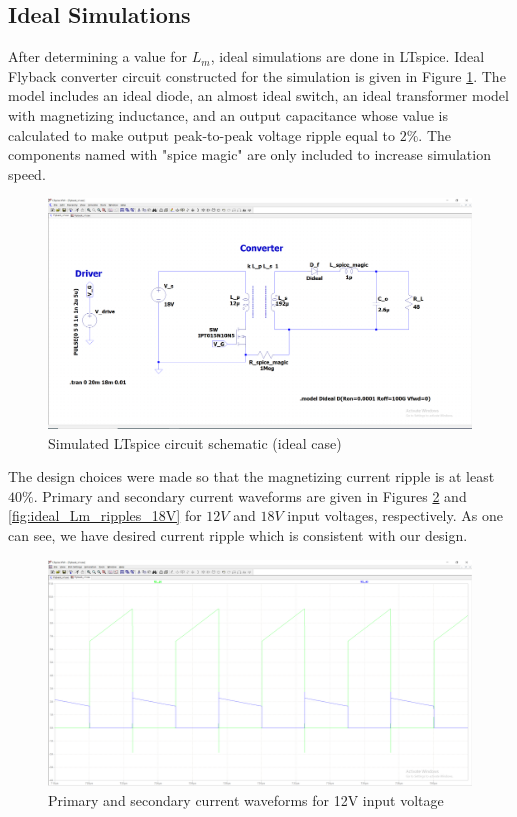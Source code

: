 \documentclass[12pt]{article}
\begin{document}
    \subsection{Ideal Simulations}
    After determining a value for $L_m$, ideal simulations are done in LTspice. Ideal Flyback converter circuit constructed for the simulation is given in Figure \ref{fig:ideal_sim_circuit}. The model includes an ideal diode, an almost ideal switch, an ideal transformer model with magnetizing inductance, and an output capacitance whose value is calculated to make output peak-to-peak voltage ripple equal to $2\%$. The components named with "spice magic" are only included to increase simulation speed.  \\
    
    \begin{figure}[H]
        \centering
        \includegraphics[scale=0.3]{img/Spice_Sim/Ideal/ideal_simulation_circuit.PNG}
        \caption{Simulated LTspice circuit schematic (ideal case)}
        \label{fig:ideal_sim_circuit}
    \end{figure}

    The design choices were made so that the magnetizing current ripple is at least $40\%$. Primary and secondary current waveforms are given in Figures \ref{fig:ideal_Lm_ripples_12V} and \ref{fig:ideal_Lm_ripples_18V} for $12V$ and $18V$ input voltages, respectively. As one can see, we have desired current ripple which is consistent with our design. \\

    \begin{figure}[H]
        \centering
        \includegraphics[scale=0.3]{img/Spice_Sim/Ideal/ideal_Lm_ripples_12V.PNG}
        \caption{Primary and secondary current waveforms for 12V input voltage}
        \label{fig:ideal_Lm_ripples_12V}
    \end{figure}
\end{document}
